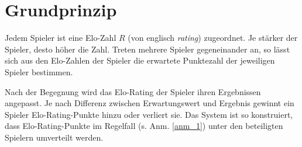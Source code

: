 \chapter{Grundprinzip}

Jedem Spieler ist eine Elo-Zahl $R$ (von englisch \textit{rating}) zugeordnet. Je stärker der Spieler, desto höher die Zahl. Treten mehrere Spieler gegeneinander an, so lässt sich aus den Elo-Zahlen der Spieler die erwartete Punktezahl der jeweiligen Spieler bestimmen.

Nach der Begegnung wird das Elo-Rating der Spieler ihren Ergebnissen angepasst. Je nach Differenz zwischen Erwartungswert und Ergebnis gewinnt ein Spieler Elo-Rating-Punkte hinzu oder verliert sie. Das System ist so konstruiert, dass Elo-Rating-Punkte im Regelfall (s. Anm. \ref{anm_1}) unter den beteiligten Spielern umverteilt werden.